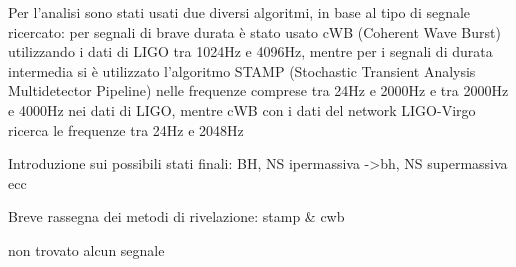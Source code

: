 Per l'analisi sono stati usati due diversi algoritmi, in base al tipo di segnale ricercato: per segnali di brave durata è stato usato cWB (Coherent Wave Burst) utilizzando i dati di LIGO tra 1024Hz e 4096Hz, mentre per i segnali di durata intermedia si è utilizzato l'algoritmo STAMP (Stochastic Transient Analysis Multidetector Pipeline) nelle frequenze comprese tra 24Hz e 2000Hz e tra 2000Hz e 4000Hz nei dati di LIGO, mentre cWB con i dati del network LIGO-Virgo ricerca le frequenze tra 24Hz e 2048Hz

Introduzione sui possibili stati finali: BH, NS ipermassiva ->bh, NS supermassiva ecc

Breve rassegna dei metodi di rivelazione: stamp \& cwb

non trovato alcun segnale


